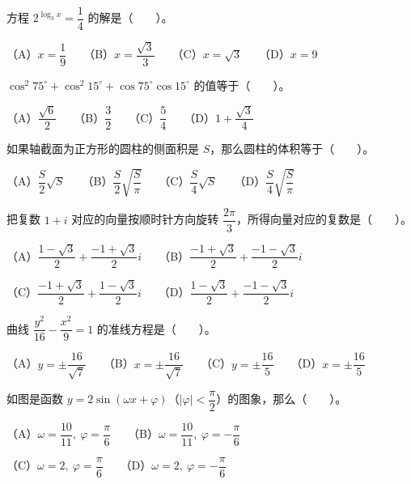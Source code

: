 \begin{question}
方程 $2^{\log_3 x}=\dfrac14$ 的解是\mbox{（　　）}。

（A）$x=\dfrac19$　　（B）$x=\dfrac{\sqrt3}{3}$　　（C）$x=\sqrt3$　　（D）$x=9$

\end{question}
\begin{question}
$\cos^2 75^\circ+\cos^2 15^\circ+\cos75^\circ\cos15^\circ$ 的值等于\mbox{（　　）}。

（A）$\dfrac{\sqrt6}{2}$　　（B）$\dfrac32$　　（C）$\dfrac54$　　（D）$1+\dfrac{\sqrt3}{4}$

\end{question}
\begin{question}
如果轴截面为正方形的圆柱的侧面积是 $S$，那么圆柱的体积等于\mbox{（　　）}。

（A）$\dfrac S2\sqrt S$　　（B）$\dfrac S2\sqrt{\dfrac S\pi}$　　（C）$\dfrac S4\sqrt S$　　（D）$\dfrac S4\sqrt{\dfrac S\pi}$

\end{question}
\begin{question}
把复数 $1+i$ 对应的向量按顺时针方向旋转 $\dfrac{2\pi}{3}$，所得向量对应的复数是\mbox{（　　）}。

（A）$\dfrac{1-\sqrt3}{2}+\dfrac{-1+\sqrt3}{2}i$　　（B）$\dfrac{-1+\sqrt3}{2}+\dfrac{-1-\sqrt3}{2}i$

（C）$\dfrac{-1+\sqrt3}{2}+\dfrac{1-\sqrt3}{2}i$　　（D）$\dfrac{1-\sqrt3}{2}+\dfrac{-1-\sqrt3}{2}i$

\end{question}
\begin{question}
曲线 $\dfrac{y^2}{16}-\dfrac{x^2}{9}=1$ 的准线方程是\mbox{（　　）}。

（A）$y=\pm\dfrac{16}{\sqrt7}$　　（B）$x=\pm\dfrac{16}{\sqrt7}$　　（C）$y=\pm\dfrac{16}{5}$　　（D）$x=\pm\dfrac{16}{5}$

\Needspace{0.4\textheight}
\end{question}
\begin{question}
如图是函数 $y=2\sin(\omega x+\varphi)$（$|\varphi|<\dfrac\pi2$）的图象，那么\mbox{（　　）}。
\nopagebreak[4]
\begin{center}\end{center}
\nopagebreak[4]
（A）$\omega=\dfrac{10}{11},\ \varphi=\dfrac\pi6$　　（B）$\omega=\dfrac{10}{11},\ \varphi=-\dfrac\pi6$

（C）$\omega=2,\ \varphi=\dfrac\pi6$　　（D）$\omega=2,\ \varphi=-\dfrac\pi6$

\end{question}
